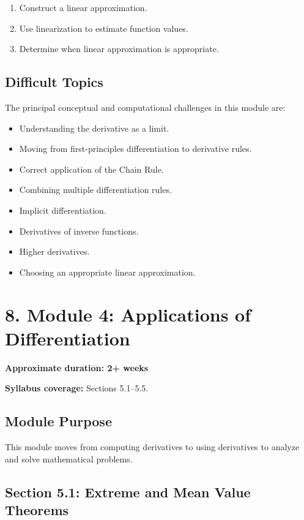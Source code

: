 \documentclass[11pt]{article}
\begin{document}
\begin{enumerate}
    \item Construct a linear approximation.
    \item Use linearization to estimate function values.
    \item Determine when linear approximation is appropriate.
\end{enumerate}

\subsection{Difficult Topics}

The principal conceptual and computational challenges in this module are:

\begin{itemize}
    \item Understanding the derivative as a limit.
    \item Moving from first-principles differentiation to derivative rules.
    \item Correct application of the Chain Rule.
    \item Combining multiple differentiation rules.
    \item Implicit differentiation.
    \item Derivatives of inverse functions.
    \item Higher derivatives.
    \item Choosing an appropriate linear approximation.
\end{itemize}

\section{8. Module 4: Applications of Differentiation}

\textbf{Approximate duration: 2+ weeks}

\textbf{Syllabus coverage:} Sections 5.1--5.5.

\subsection{Module Purpose}

This module moves from computing derivatives to using derivatives to analyze
and solve mathematical problems.

\subsection{Section 5.1: Extreme and Mean Value Theorems}
\end{document}
